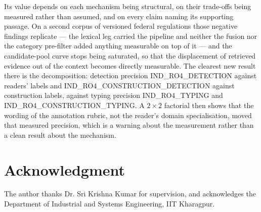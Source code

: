 \documentclass[conference]{IEEEtran}
\begin{document}
Its value depends on each mechanism being structural, on their trade-offs being
measured rather than assumed, and on every claim naming its supporting passage.
On a second corpus of versioned federal regulations those negative findings
replicate --- the lexical leg carried the pipeline and neither the fusion nor
the category pre-filter added anything measurable on top of it --- and the
candidate-pool curve stops being saturated, so that the displacement of
retrieved evidence out of the context becomes directly measurable. The
clearest new result there is the decomposition: detection precision
{{IND_RO4_DETECTION}} against readers' labels and
{{IND_RO4_CONSTRUCTION_DETECTION}} against construction labels, against typing
precision {{IND_RO4_TYPING}} and {{IND_RO4_CONSTRUCTION_TYPING}}. A
$2\times2$ factorial then shows that the wording of the annotation rubric,
not the reader's domain specialisation, moved that measured precision, which
is a warning about the measurement rather than a clean result about the
mechanism.

\section*{Acknowledgment}
The author thanks Dr. Sri Krishna Kumar for supervision, and acknowledges the
Department of Industrial and Systems Engineering, IIT Kharagpur.
\end{document}
